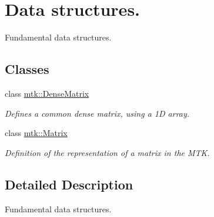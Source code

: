 \hypertarget{group__c04-data__structures}{\section{Data structures.}
\label{group__c04-data__structures}
}


Fundamental data structures.  


\subsection*{Classes}
\begin{DoxyCompactItemize}
\item 
class \hyperlink{classmtk_1_1DenseMatrix}{mtk\-::\-Dense\-Matrix}
\begin{DoxyCompactList}\small\item\em Defines a common dense matrix, using a 1\-D array. \end{DoxyCompactList}\item 
class \hyperlink{classmtk_1_1Matrix}{mtk\-::\-Matrix}
\begin{DoxyCompactList}\small\item\em Definition of the representation of a matrix in the M\-T\-K. \end{DoxyCompactList}\end{DoxyCompactItemize}


\subsection{Detailed Description}
Fundamental data structures. 